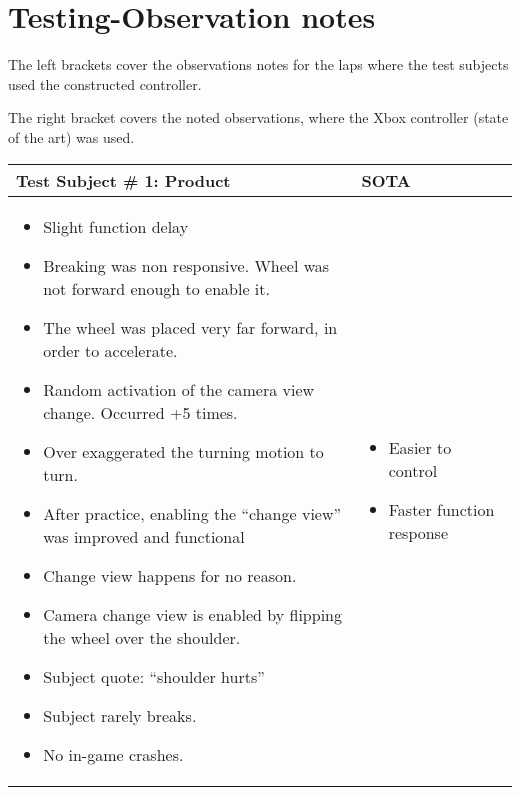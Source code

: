 \section{Testing-Observation notes} \label{app:obs}
The left brackets cover the observations notes for the laps where the test subjects used the constructed controller.

The right bracket covers the noted observations, where the Xbox controller (state of the art) was used.

\begin{table}[!htbp]
\centering
\begin{tabular}{| p{3.4in} | p{2in} |}
\hline
	\textbf{Test Subject \# 1: Product} & \textbf{SOTA}\\
\hline
	\begin{itemize}
		\item Slight function delay
		\item Breaking was non responsive. Wheel was not forward enough to enable it.
		\item The wheel was placed very far forward, in order to accelerate.
		\item Random activation of the camera view change. Occurred +5 times.
		\item Over exaggerated the turning motion to turn.
		\item After practice, enabling the “change view” was improved and functional
		\item Change view happens for no reason.
		\item Camera change view is enabled by flipping the wheel over the shoulder.
		\item Subject quote: “shoulder hurts”
		\item Subject rarely breaks.
		\item No in-game crashes.
	\end{itemize}
	&
	\begin{itemize}
		\item Easier to control
		\item Faster function response
	\end{itemize}
	\\
\hline
\end{tabular}
\end{table}


